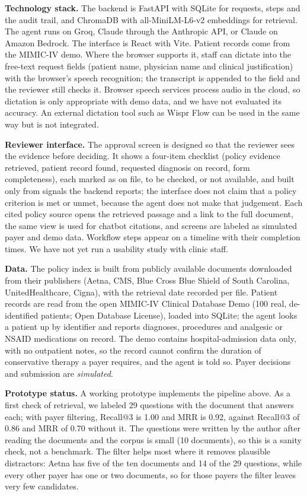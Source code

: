 \documentclass[final]{cvpr}
\begin{document}
\textbf{Technology stack.} The backend is FastAPI with SQLite for requests, steps and the audit trail, and ChromaDB with all-MiniLM-L6-v2 embeddings for retrieval. The agent runs on Groq, Claude through the Anthropic API, or Claude on Amazon Bedrock. The interface is React with Vite. Patient records come from the MIMIC-IV demo. Where the browser supports it, staff can dictate into the free-text request fields (patient name, physician name and clinical justification) with the browser's speech recognition; the transcript is appended to the field and the reviewer still checks it. Browser speech services process audio in the cloud, so dictation is only appropriate with demo data, and we have not evaluated its accuracy. An external dictation tool such as Wispr Flow can be used in the same way but is not integrated.

\textbf{Reviewer interface.} The approval screen is designed so that the reviewer sees the evidence before deciding. It shows a four-item checklist (policy evidence retrieved, patient record found, requested diagnosis on record, form completeness), each marked as on file, to be checked, or not available, and built only from signals the backend reports; the interface does not claim that a policy criterion is met or unmet, because the agent does not make that judgement. Each cited policy source opens the retrieved passage and a link to the full document, the same view is used for chatbot citations, and screens are labeled as simulated payer and demo data. Workflow steps appear on a timeline with their completion times. We have not yet run a usability study with clinic staff.

\textbf{Data.} The policy index is built from publicly available documents downloaded from their publishers (Aetna, CMS, Blue Cross Blue Shield of South Carolina, UnitedHealthcare, Cigna), with the retrieval date recorded per file. Patient records are read from the open MIMIC-IV Clinical Database Demo \cite{mimicdemo} (100 real, de-identified patients; Open Database License), loaded into SQLite; the agent looks a patient up by identifier and reports diagnoses, procedures and analgesic or NSAID medications on record. The demo contains hospital-admission data only, with no outpatient notes, so the record cannot confirm the duration of conservative therapy a payer requires, and the agent is told so. Payer decisions and submission are \emph{simulated}.

\textbf{Prototype status.} A working prototype implements the pipeline above. As a first check of retrieval, we labeled 29 questions with the document that answers each; with payer filtering, Recall@3 is 1.00 and MRR is 0.92, against Recall@3 of 0.86 and MRR of 0.70 without it. The questions were written by the author after reading the documents and the corpus is small (10 documents), so this is a sanity check, not a benchmark. The filter helps most where it removes plausible distractors: Aetna has five of the ten documents and 14 of the 29 questions, while every other payer has one or two documents, so for those payers the filter leaves very few candidates.
\end{document}
